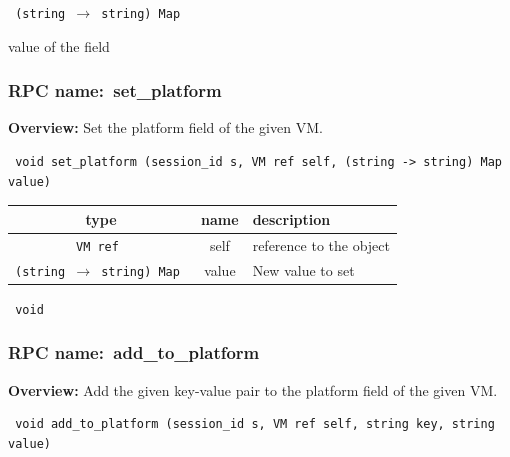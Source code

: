 \vspace{0.3cm}

{\tt 
(string $\rightarrow$ string) Map
}


value of the field
\vspace{0.3cm}
\vspace{0.3cm}
\vspace{0.3cm}
\subsubsection{RPC name:~set\_platform}

{\bf Overview:} 
Set the platform field of the given VM.

\begin{verbatim} void set_platform (session_id s, VM ref self, (string -> string) Map value)\end{verbatim}



 
\vspace{0.3cm}
\begin{tabular}{|c|c|p{7cm}|}
 \hline
{\bf type} & {\bf name} & {\bf description} \\ \hline
{\tt VM ref } & self & reference to the object \\ \hline 

{\tt (string $\rightarrow$ string) Map } & value & New value to set \\ \hline 

\end{tabular}

\vspace{0.3cm}

{\tt 
void
}



\vspace{0.3cm}
\vspace{0.3cm}
\vspace{0.3cm}
\subsubsection{RPC name:~add\_to\_platform}

{\bf Overview:} 
Add the given key-value pair to the platform field of the given VM.

\begin{verbatim} void add_to_platform (session_id s, VM ref self, string key, string value)\end{verbatim}


